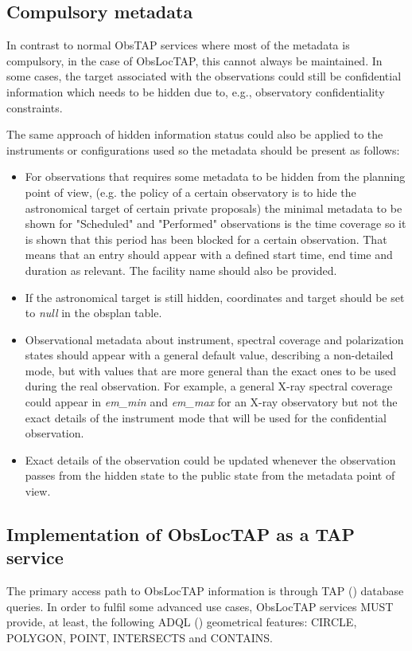 \documentclass[11pt,a4paper]{ivoa}
\begin{document}
\subsection{Compulsory metadata}
In contrast to normal ObsTAP services where most of the metadata is compulsory,
in the case of ObsLocTAP, this cannot always be maintained. In some cases, the
target associated with the observations could still be confidential information
which needs to be hidden due to, e.g., observatory confidentiality constraints.

The same approach of hidden information status could also be applied to the
instruments or configurations used so the metadata should be present as follows:

\begin{itemize}
	\item{For observations that requires some metadata to be hidden from the
	 planning point of view, (e.g. the policy of a certain observatory is to
	 hide the astronomical target of certain private proposals) the minimal
	 metadata to be shown for "Scheduled" and "Performed" observations is the
	 time coverage so it is shown that this period has been blocked for a
	 certain observation.
	 That means that an entry should appear with a defined start time, end time
	 and duration as relevant. The facility name should also be provided.}
	 
	\item{If the astronomical target is still hidden, coordinates and target
  should be set to \textit{null} in the obsplan table.}

	\item{Observational metadata about instrument, spectral coverage and
  polarization states should appear with a general default value, describing a
  non-detailed mode, but with values that are more general than the exact ones
  to be used during the real observation. For example, a general X-ray spectral
  coverage could appear in \textit{em\_min} and \textit{em\_max} for an X-ray
  observatory but not the exact details of the instrument mode that will be used
  for the confidential observation.}

	\item{Exact details of the observation could be updated whenever the
  observation passes from the hidden state to the public state from the
  metadata point of view.}

\end{itemize}

\subsection{Implementation of ObsLocTAP as a TAP service}
The primary access path to ObsLocTAP information is through TAP
(\citealt{2010ivoa.spec.0327D}) database queries. In order to fulfil some advanced
use cases, ObsLocTAP services MUST provide, at least, the following ADQL
(\citealt{2008ivoa.spec.1030O}) geometrical features: CIRCLE, POLYGON, POINT, INTERSECTS and CONTAINS.\par
\end{document}
